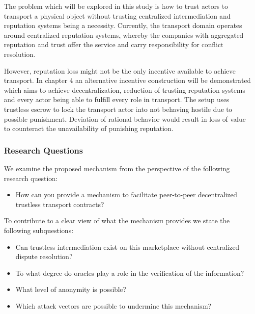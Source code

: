 The problem which will be explored in this study is how to trust actors to transport a physical object without trusting centralized intermediation and reputation systems being a necessity. Currently, the transport domain operates around centralized reputation systems, whereby the companies with aggregated reputation and trust offer the service and carry responsibility for conflict resolution.\par
However, reputation loss might not be the only incentive available to achieve transport. In chapter 4 an alternative incentive construction will be demonstrated which aims to achieve decentralization, reduction of trusting reputation systems and every actor being able to fulfill every role in transport. The setup uses trustless escrow to lock the transport actor into not behaving hostile due to possible punishment. Deviation of rational behavior would result in loss of value to counteract the unavailability of punishing reputation.

\subsubsection{Research Questions}

\bigbreak
\noindent We examine the proposed mechanism from the perspective of the following research question:
\begin{itemize}
  \item How can you provide a mechanism to facilitate peer-to-peer decentralized trustless transport contracts?
\end{itemize}
\bigbreak
\noindent To contribute to a clear view of what the mechanism provides we state the following subquestions:
\bigbreak
\begin{itemize}
  \item Can trustless intermediation exist on this marketplace without centralized dispute resolution?
  \item To what degree do oracles play a role in the verification of the information?
  \item What level of anonymity is possible?
  \item Which attack vectors are possible to undermine this mechanism?
\end{itemize}

